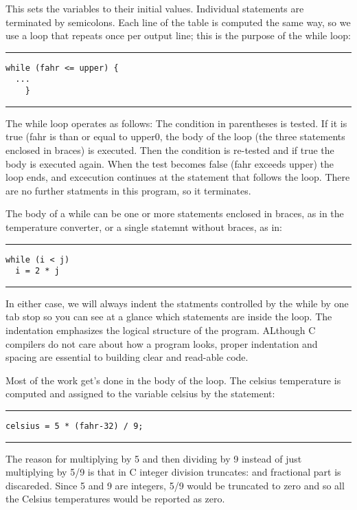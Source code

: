 \documentclass[a4paper]{article}
\begin{document}
This sets the variables to their initial values. Individual statements are
terminated by semicolons.
Each line of the table is computed the same way, so we use a loop that repeats
once per output line; this is the purpose of the while loop:

\noindent\rule{\textwidth}{0.5pt}
\begin{verbatim}
while (fahr <= upper) {
  ...
    }
\end{verbatim}

\noindent\rule{\textwidth}{0.5pt}
The while loop operates as follows: The condition in parentheses is tested. If
it is true (fahr is than or equal to upper0, the body of the loop (the three
statements enclosed in braces) is executed. Then the condition is re-tested and
if true the body is executed again. When the test becomes false (fahr exceeds
upper) the loop ends, and excecution continues at the statement that follows the
loop. There are no further statments in this program, so it terminates.

The body of a while can be one or more statements enclosed in braces, as in the
temperature converter, or a single statemnt without braces, as in:

\noindent\rule{\textwidth}{0.5pt}
\begin{verbatim}
while (i < j)
  i = 2 * j
\end{verbatim}

\noindent\rule{\textwidth}{0.5pt}

In either case, we will always indent the statments controlled by the while by
one tab stop so you can see at a glance which statements are inside the
loop. The indentation emphasizes the logical structure of the program. ALthough
C compilers do not care about how a program looks, proper indentation and
spacing are essential to building clear and read-able code.

Most of the work get's done in the body of the loop. The celsius temperature is
computed and assigned to the variable celsius by the statement:

\noindent\rule{\textwidth}{0.5pt}
\begin{verbatim}
celsius = 5 * (fahr-32) / 9;
\end{verbatim}

\noindent\rule{\textwidth}{0.5pt}

The reason for multiplying by 5 and then dividing by 9 instead of just
multiplying by 5/9 is that in C integer division truncates: and fractional part
is discareded. Since 5 and 9 are integers, 5/9 would be truncated to zero and so
all the Celsius temperatures would be reported as zero.
\end{document}
